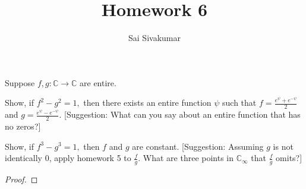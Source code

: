 \documentclass[12pt]{amsart}
\title{Homework 6}
\author{Sai Sivakumar}
\newcommand{\CC}{\mathbb{C}}
\begin{document}
\maketitle

\thispagestyle{empty}

Suppose $f,g:\CC\to\CC$ are entire. 

Show, if $f^2-g^2=1,$ then there exists an entire function $\psi$ such that $f=\frac{e^\psi + e^{-\psi}}{2}$ and $g=\frac{e^{\psi} - e^{-\psi}}{2}.$ [Suggestion: What can you say about an entire function that has no zeros?]

Show, if $f^3-g^3=1,$ then $f$ and $g$ are constant. [Suggestion: Assuming $g$ is not identically $0$, apply homework 5 to  $\frac{f}{g}$. What are three points in $\CC_\infty$ that $\frac{f}{g}$ omits?]

 \bigskip

\begin{proof}
\baselineskip=24pt

\end{proof}
\end{document}
